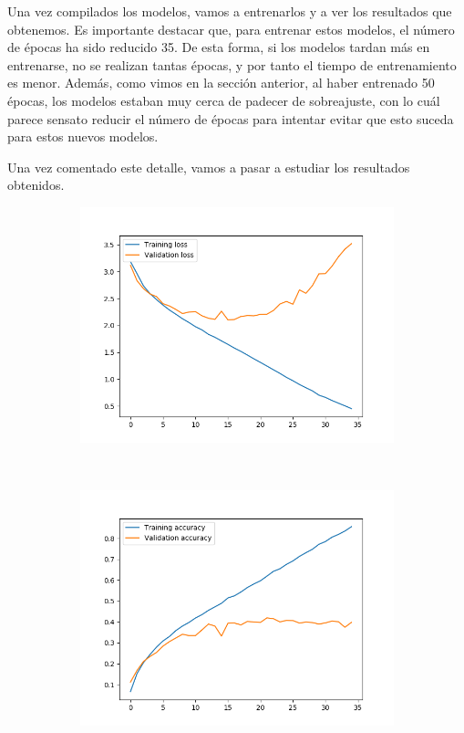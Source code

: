 \documentclass[11pt,a4paper]{article}
\begin{document}
Una vez compilados los modelos, vamos a entrenarlos y a ver los resultados que obtenemos. Es importante destacar que, para entrenar
estos modelos, el número de épocas ha sido reducido 35. De esta forma, si los modelos tardan más en entrenarse, no se realizan
tantas épocas, y por tanto el tiempo de entrenamiento es menor. Además, como vimos en la sección anterior, al haber entrenado 50
épocas, los modelos estaban muy cerca de padecer de sobreajuste, con lo cuál parece sensato reducir el número de épocas para
intentar evitar que esto suceda para estos nuevos modelos.

Una vez comentado este detalle, vamos a pasar a estudiar los resultados obtenidos.

\begin{figure}[H]
  \centering
  \begin{subfigure}{.5\textwidth}
    \includegraphics[scale=0.4]{img/deep1-nodrop-loss.png}
    \label{fig:deep1-nodrop-loss}
  \end{subfigure}%
  ~ \quad
  \begin{subfigure}{.5\textwidth}
    \includegraphics[scale=0.4]{img/deep1-nodrop-acc.png}

\end{subfigure}
\end{figure}
\end{document}
